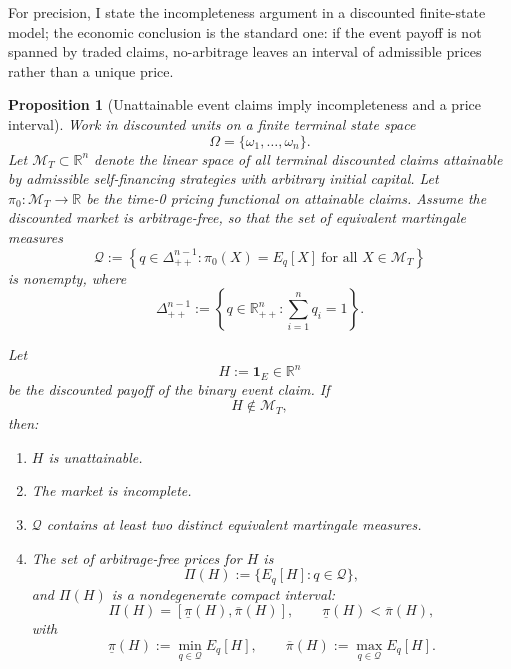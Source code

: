 \documentclass[12pt,a4paper]{article}
\newtheorem{proposition}{Proposition}
\begin{document}
For precision, I state the incompleteness argument in a discounted finite-state model; the economic conclusion is the standard one: if the event payoff is not spanned by traded claims, no-arbitrage leaves an interval of admissible prices rather than a unique price.

\begin{proposition}[Unattainable event claims imply incompleteness and a price interval]
Work in discounted units on a finite terminal state space
\[
\Omega=\{\omega_1,\dots,\omega_n\}.
\]
Let $\mathcal{M}_T \subset \mathbb{R}^n$ denote the linear space of all terminal discounted claims attainable by admissible self-financing strategies with arbitrary initial capital. Let $\pi_0:\mathcal{M}_T \to \mathbb{R}$ be the time-0 pricing functional on attainable claims. Assume the discounted market is arbitrage-free, so that the set of equivalent martingale measures
\[
\mathcal{Q}
:=
\left\{
q\in \Delta_{++}^{n-1} :
\pi_0(X)=E_q[X]\ \text{for all }X\in\mathcal{M}_T
\right\}
\]
is nonempty, where
\[
\Delta_{++}^{n-1}:=\left\{q\in \mathbb{R}_{++}^n:\sum_{i=1}^n q_i=1\right\}.
\]

Let
\[
H:=\mathbf{1}_E\in\mathbb{R}^n
\]
be the discounted payoff of the binary event claim. If
\[
H\notin \mathcal{M}_T,
\]
then:

\begin{enumerate}
\item $H$ is unattainable.
\item The market is incomplete.
\item $\mathcal{Q}$ contains at least two distinct equivalent martingale measures.
\item The set of arbitrage-free prices for $H$ is
\[
\Pi(H):=\{E_q[H]:q\in\mathcal{Q}\},
\]
and $\Pi(H)$ is a nondegenerate compact interval:
\[
\Pi(H)=[\underline{\pi}(H),\overline{\pi}(H)],
\qquad
\underline{\pi}(H)<\overline{\pi}(H),
\]
with
\[
\underline{\pi}(H):=\min_{q\in\mathcal{Q}}E_q[H],
\qquad
\overline{\pi}(H):=\max_{q\in\mathcal{Q}}E_q[H].
\]
\end{enumerate}
\end{proposition}
\end{document}
